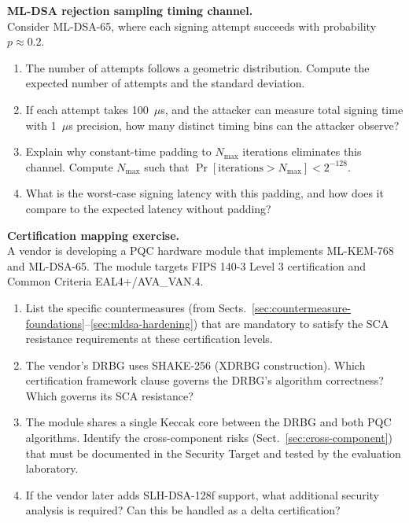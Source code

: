 \begin{prob}
\label{prob:ch13-rejection-timing}
\textbf{ML-DSA rejection sampling timing channel.}\\
Consider ML-DSA-65, where each signing attempt succeeds with probability $p \approx 0.2$.
\begin{enumerate}
\item[(a)] The number of attempts follows a geometric distribution.  Compute the expected number of attempts and the standard deviation.
\item[(b)] If each attempt takes 100~$\mu$s, and the attacker can measure total signing time with 1~$\mu$s precision, how many distinct timing bins can the attacker observe?
\item[(c)] Explain why constant-time padding to $N_{\max}$ iterations eliminates this channel.  Compute $N_{\max}$ such that $\Pr[\text{iterations} > N_{\max}] < 2^{-128}$.
\item[(d)] What is the worst-case signing latency with this padding, and how does it compare to the expected latency without padding?
\end{enumerate}
\end{prob}

\begin{prob}
\label{prob:ch13-certification}
\textbf{Certification mapping exercise.}\\
A vendor is developing a PQC hardware module that implements ML-KEM-768 and ML-DSA-65.  The module targets FIPS 140-3 Level 3 certification and Common Criteria EAL4+/AVA\_VAN.4.
\begin{enumerate}
\item[(a)] List the specific countermeasures (from Sects.~\ref{sec:countermeasure-foundations}--\ref{sec:mldsa-hardening}) that are mandatory to satisfy the SCA resistance requirements at these certification levels.
\item[(b)] The vendor's DRBG uses SHAKE-256 (XDRBG construction).  Which certification framework clause governs the DRBG's algorithm correctness?  Which governs its SCA resistance?
\item[(c)] The module shares a single Keccak core between the DRBG and both PQC algorithms.  Identify the cross-component risks (Sect.~\ref{sec:cross-component}) that must be documented in the Security Target and tested by the evaluation laboratory.
\item[(d)] If the vendor later adds SLH-DSA-128f support, what additional security analysis is required?  Can this be handled as a delta certification?
\end{enumerate}
\end{prob}

